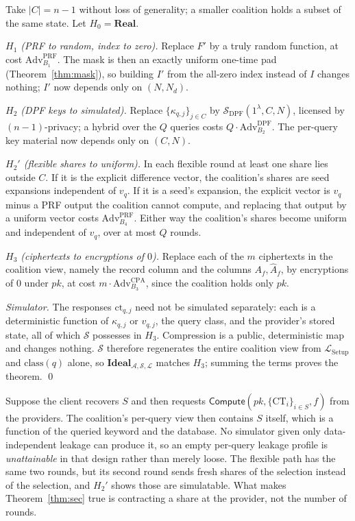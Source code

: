 \documentclass[a4paper,fleqn]{cas-sc}
\newcommand{\Real}{\mathbf{Real}}
\newcommand{\Ideal}{\mathbf{Ideal}}
\newcommand{\Leak}{\mathcal{L}}
\newcommand{\Sim}{\mathcal{S}}
\newcommand{\Adv}{\mathcal{A}}
\newcommand{\Compute}{\mathsf{Compute}}
\begin{document}
\begin{pf}
Take $|C|=n-1$ without loss of generality; a smaller coalition holds a subset
of the same state. Let $H_0=\Real$.

\emph{$H_1$ (PRF to random, index to zero).} Replace $F'$ by a truly random
function, at cost $\mathrm{Adv}^{\mathrm{PRF}}_{B_1}$. The mask is then an
exactly uniform one-time pad (Theorem~\ref{thm:mask}), so building $I'$ from
the all-zero index instead of $I$ changes nothing; $I'$ now depends only on
$(N,N_d)$.

\emph{$H_2$ (DPF keys to simulated).} Replace $\{\kappa_{q,j}\}_{j\in C}$ by
$\Sim_{\mathrm{DPF}}(1^\lambda,C,N)$, licensed by $(n{-}1)$-privacy; a hybrid
over the $Q$ queries costs $Q\cdot\mathrm{Adv}^{\mathrm{DPF}}_{B_2}$. The
per-query key material now depends only on $(C,N)$.

\emph{$H_2'$ (flexible shares to uniform).} In each flexible round at least one
share lies outside $C$. If it is the explicit difference vector, the
coalition's shares are seed expansions independent of $v_q$. If it is a seed's
expansion, the explicit vector is $v_q$ minus a PRF output the coalition cannot
compute, and replacing that output by a uniform vector costs
$\mathrm{Adv}^{\mathrm{PRF}}_{B_4}$. Either way the coalition's shares become
uniform and independent of $v_q$, over at most $Q$ rounds.

\emph{$H_3$ (ciphertexts to encryptions of $0$).} Replace each of the $m$
ciphertexts in the coalition view, namely the record column and the columns
$A_f,\widehat A_f$, by encryptions of $0$ under $pk$,
at cost $m\cdot\mathrm{Adv}^{\mathrm{CPA}}_{B_3}$, since the coalition holds
only $pk$.

\emph{Simulator.} The responses $\text{ct}_{q,j}$ need not be simulated
separately: each is a deterministic function of $\kappa_{q,j}$ or $v_{q,j}$,
the query class, and the provider's stored state, all of which $\Sim$
possesses in $H_3$. Compression is a public, deterministic map and changes
nothing. $\Sim$ therefore regenerates the entire coalition view from
$\Leak_{\mathrm{Setup}}$ and $\mathrm{class}(q)$ alone, so
$\Ideal_{\Adv,\Sim,\Leak}$ matches $H_3$; summing the terms proves the
theorem. \qed
\end{pf}

\begin{remark}
\label{rem:v1}
Suppose the client recovers $S$ and then requests
$\Compute(pk,\{\text{CT}_i\}_{i\in S},f)$ from the providers. The coalition's
per-query view then contains $S$ itself, which is a function of the queried
keyword and the database. No simulator given only data-independent leakage can
produce it, so an empty per-query leakage profile is \emph{unattainable} in
that design rather than merely loose. The flexible path has the same two
rounds, but its second round sends fresh shares of the selection instead of
the selection, and $H_2'$ shows those are simulatable. What makes
Theorem~\ref{thm:sec} true is contracting a share at the provider, not the
number of rounds.
\end{remark}
\end{document}
